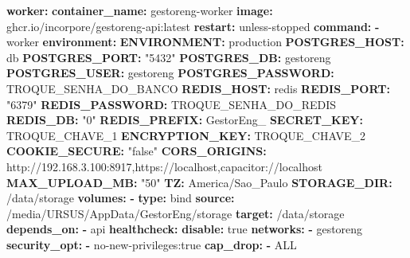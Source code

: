 \documentclass[
  10pt,
]{article}
\newenvironment{Shaded}{\begin{snugshade}}{\end{snugshade}}
\newcommand{\AttributeTok}[1]{\textcolor[rgb]{0.13,0.29,0.53}{#1}}
\newcommand{\CharTok}[1]{\textcolor[rgb]{0.31,0.60,0.02}{#1}}
\newcommand{\FunctionTok}[1]{\textcolor[rgb]{0.13,0.29,0.53}{\textbf{#1}}}
\newcommand{\KeywordTok}[1]{\textcolor[rgb]{0.13,0.29,0.53}{\textbf{#1}}}
\newcommand{\StringTok}[1]{\textcolor[rgb]{0.31,0.60,0.02}{#1}}
\begin{document}
\begin{Shaded}
\begin{Highlighting}[]
\AttributeTok{  }\FunctionTok{worker}\KeywordTok{:}
\AttributeTok{    }\FunctionTok{container\_name}\KeywordTok{:}\AttributeTok{ gestoreng{-}worker}
\AttributeTok{    }\FunctionTok{image}\KeywordTok{:}\AttributeTok{ ghcr.io/incorpore/gestoreng{-}api:latest}
\AttributeTok{    }\FunctionTok{restart}\KeywordTok{:}\AttributeTok{ unless{-}stopped}
\AttributeTok{    }\FunctionTok{command}\KeywordTok{:}
\AttributeTok{      }\KeywordTok{{-}}\AttributeTok{ worker}
\AttributeTok{    }\FunctionTok{environment}\KeywordTok{:}
\AttributeTok{      }\FunctionTok{ENVIRONMENT}\KeywordTok{:}\AttributeTok{ production}
\AttributeTok{      }\FunctionTok{POSTGRES\_HOST}\KeywordTok{:}\AttributeTok{ db}
\AttributeTok{      }\FunctionTok{POSTGRES\_PORT}\KeywordTok{:}\AttributeTok{ }\StringTok{"5432"}
\AttributeTok{      }\FunctionTok{POSTGRES\_DB}\KeywordTok{:}\AttributeTok{ gestoreng}
\AttributeTok{      }\FunctionTok{POSTGRES\_USER}\KeywordTok{:}\AttributeTok{ gestoreng}
\AttributeTok{      }\FunctionTok{POSTGRES\_PASSWORD}\KeywordTok{:}\AttributeTok{ TROQUE\_SENHA\_DO\_BANCO}
\AttributeTok{      }\FunctionTok{REDIS\_HOST}\KeywordTok{:}\AttributeTok{ redis}
\AttributeTok{      }\FunctionTok{REDIS\_PORT}\KeywordTok{:}\AttributeTok{ }\StringTok{"6379"}
\AttributeTok{      }\FunctionTok{REDIS\_PASSWORD}\KeywordTok{:}\AttributeTok{ TROQUE\_SENHA\_DO\_REDIS}
\AttributeTok{      }\FunctionTok{REDIS\_DB}\KeywordTok{:}\AttributeTok{ }\StringTok{"0"}
\AttributeTok{      }\FunctionTok{REDIS\_PREFIX}\KeywordTok{:}\AttributeTok{ GestorEng\_}
\AttributeTok{      }\FunctionTok{SECRET\_KEY}\KeywordTok{:}\AttributeTok{ TROQUE\_CHAVE\_1}
\AttributeTok{      }\FunctionTok{ENCRYPTION\_KEY}\KeywordTok{:}\AttributeTok{ TROQUE\_CHAVE\_2}
\AttributeTok{      }\FunctionTok{COOKIE\_SECURE}\KeywordTok{:}\AttributeTok{ }\StringTok{"false"}
\AttributeTok{      }\FunctionTok{CORS\_ORIGINS}\KeywordTok{:}\AttributeTok{ http://192.168.3.100:8917,https://localhost,capacitor://localhost}
\AttributeTok{      }\FunctionTok{MAX\_UPLOAD\_MB}\KeywordTok{:}\AttributeTok{ }\StringTok{"50"}
\AttributeTok{      }\FunctionTok{TZ}\KeywordTok{:}\AttributeTok{ America/Sao\_Paulo}
\AttributeTok{      }\FunctionTok{STORAGE\_DIR}\KeywordTok{:}\AttributeTok{ /data/storage}
\AttributeTok{    }\FunctionTok{volumes}\KeywordTok{:}
\AttributeTok{      }\KeywordTok{{-}}\AttributeTok{ }\FunctionTok{type}\KeywordTok{:}\AttributeTok{ bind}
\AttributeTok{        }\FunctionTok{source}\KeywordTok{:}\AttributeTok{ /media/URSUS/AppData/GestorEng/storage}
\AttributeTok{        }\FunctionTok{target}\KeywordTok{:}\AttributeTok{ /data/storage}
\AttributeTok{    }\FunctionTok{depends\_on}\KeywordTok{:}
\AttributeTok{      }\KeywordTok{{-}}\AttributeTok{ api}
\AttributeTok{    }\FunctionTok{healthcheck}\KeywordTok{:}
\AttributeTok{      }\FunctionTok{disable}\KeywordTok{:}\AttributeTok{ }\CharTok{true}
\AttributeTok{    }\FunctionTok{networks}\KeywordTok{:}
\AttributeTok{      }\KeywordTok{{-}}\AttributeTok{ gestoreng}
\AttributeTok{    }\FunctionTok{security\_opt}\KeywordTok{:}
\AttributeTok{      }\KeywordTok{{-}}\AttributeTok{ no{-}new{-}privileges:true}
\AttributeTok{    }\FunctionTok{cap\_drop}\KeywordTok{:}
\AttributeTok{      }\KeywordTok{{-}}\AttributeTok{ ALL}


\end{Highlighting}
\end{Shaded}
\end{document}
